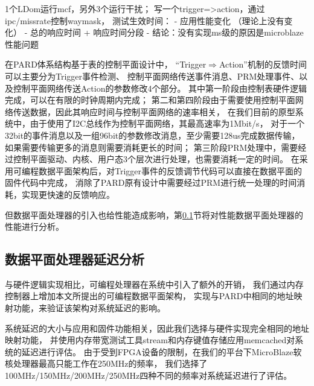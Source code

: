 1个LDom运行mcf，另外3个运行干扰；
写一个trigger=>action，通过ipc/missrate控制waymask，
测试生效时间：
 - 应用性能变化 （理论上没有变化）
 - 总的响应时间 + 响应时间分段
 - 结论：没有实现ms级的原因是microblaze性能问题

在PARD体系结构基于表的控制平面设计中，
``Trigger$\Rightarrow$Action''机制的反馈时间可以主要分为Trigger事件检测、
控制平面网络传送事件消息、PRM处理事件、以及控制平面网络传送Action的参数修改4个部分。
其中第一阶段由控制表硬件逻辑完成，可以在有限的时钟周期内完成；
第二和第四阶段由于需要使用控制平面网络传送数据，因此其响应时间与控制平面网络的速率相关，
在我们目前的原型系统中，由于使用了I2C总线作为控制平面网络，其最高速率为1Mbit/s，
对于一个32bit的事件消息以及一组96bit的参数修改消息，至少需要128us完成数据传输，
如果需要传输更多的消息则需要消耗更长的时间；
第三阶段PRM处理中，需要经过控制平面驱动、内核、用户态3个层次进行处理，也需要消耗一定的时间。
在采用可编程数据平面架构后，对Trigger事件的反馈调节代码可以直接在数据平面的固件代码中完成，
消除了PARD原有设计中需要经过PRM进行统一处理的时间消耗，实现更快速的反馈响应。

但数据平面处理器的引入也给性能造成影响，第\ref{chap:impl:dp-latency}节将对性能数据平面处理器的性能进行分析。


%

\subsection{数据平面处理器延迟分析}
\label{chap:impl:dp-latency}


与硬件逻辑实现相比，可编程处理器在系统中引入了额外的开销，
我们通过内存控制器上增加本文所提出的可编程数据平面架构，
实现与PARD中相同的地址映射功能，来验证该架构对系统延迟的影响。

系统延迟的大小与应用和固件功能相关，因此我们选择与硬件实现完全相同的地址映射功能，
并使用内存带宽测试工具stream和内存键值存储应用memcached对系统的延迟进行评估。
由于受到FPGA设备的限制，在我们的平台下MicroBlaze软核处理器最高只能工作在250MHz的频率，
我们选择了100MHz/150MHz/200MHz/250MHz四种不同的频率对系统延迟进行了评估。

